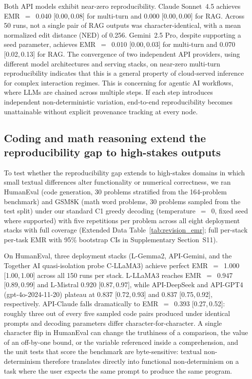 \documentclass[sn-nature]{sn-jnl}
\begin{document}
Both API models exhibit near-zero reproducibility.
Claude Sonnet~4.5 achieves EMR~$=$~0.040 [0.00,\,0.08] for multi-turn and 0.000 [0.00,\,0.00] for RAG. Across 50 runs, not a single pair of RAG outputs was character-identical, with a mean normalized edit distance (NED) of 0.256.
Gemini~2.5 Pro, despite supporting a seed parameter, achieves EMR~$=$~0.010 [0.00,\,0.03] for multi-turn and 0.070 [0.02,\,0.13] for RAG.
The convergence of two independent API providers, using different model architectures and serving stacks, on near-zero multi-turn reproducibility indicates that this is a general property of cloud-served inference for complex interaction regimes.
This is concerning for agentic AI workflows, where LLMs are chained across multiple steps.
If each step introduces independent non-deterministic variation, end-to-end reproducibility becomes unattainable without explicit provenance tracking at every node.


\subsection{Coding and math reasoning extend the reproducibility gap to high-stakes outputs}\label{subsec:codemath}

To test whether the reproducibility gap extends to high-stakes domains in which small textual differences alter functionality or numerical correctness, we ran HumanEval (code generation, 30 problems stratified from the 164-problem benchmark\cite{chen2021humaneval}) and GSM8K (math word problems, 30 problems sampled from the test split\cite{cobbe2021gsm8k}) under our standard C1 greedy decoding (temperature~$=$~0, fixed seed where supported) with five repetitions per problem across all eight deployment stacks with full coverage (Extended Data Table~\ref{tab:revision_emr}; full per-stack per-task EMR with 95\% bootstrap CIs in Supplementary Section~S11).

On HumanEval, three deployment stacks (L-Gemma2, API-Gemini, and the Together AI quasi-isolation probe C-LLaMA3) achieve perfect EMR~$=$~1.000 [1.00,\,1.00] across all 150 runs per stack.
L-LLaMA3 reaches EMR~$=$~0.947 [0.89,\,0.99] and L-Mistral 0.920 [0.87,\,0.97], while API-DeepSeek and API-GPT4 (gpt-4o-2024-11-20) plateau at 0.837 [0.72,\,0.93] and 0.837 [0.75,\,0.92], respectively.
API-Claude falls dramatically to EMR~$=$~0.393 [0.27,\,0.52]: roughly three out of every five sampled code pairs produced under identical prompts and decoding parameters differ character-for-character.
A single character flip in HumanEval can change the truthiness of a comparison, the value of an off-by-one bound, or the variable referenced inside a comprehension, and the unit tests that score the benchmark are byte-sensitive: textual non-determinism therefore translates directly into functional non-determinism on a task where the user expects the same prompt to produce the same program.
\end{document}
